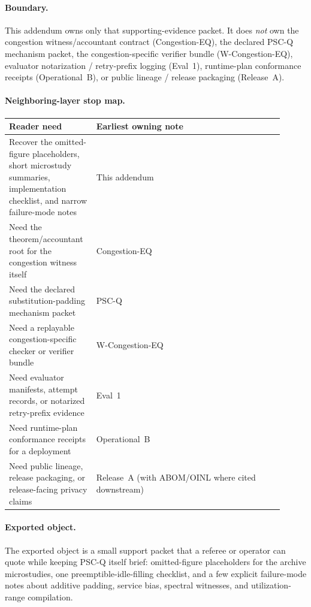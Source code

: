 \documentclass[11pt]{article}
\theoremstyle{definition}
\theoremstyle{remark}
\begin{document}
\paragraph{Boundary.}
This addendum owns only that supporting-evidence packet.
It does \emph{not} own the congestion witness/accountant contract (Congestion-EQ), the declared PSC-Q mechanism packet, the congestion-specific verifier bundle (W-Congestion-EQ), evaluator notarization / retry-prefix logging (Eval~1), runtime-plan conformance receipts (Operational~B), or public lineage / release packaging (Release~A).\cite{series:congeq,series:pscq,series:wcongeq,series:evalnotary,series:opb,series:releaseproperty}

\paragraph{Neighboring-layer stop map.}
\medskip
\noindent\begin{center}
\small
\begin{tabular}{p{0.27\linewidth}p{0.64\linewidth}}
\toprule
Reader need & Earliest owning note \\
\midrule
Recover the omitted-figure placeholders, short microstudy summaries, implementation checklist, and narrow failure-mode notes & This addendum \\
Need the theorem/accountant root for the congestion witness itself & Congestion-EQ \\
Need the declared substitution-padding mechanism packet & PSC-Q \\
Need a replayable congestion-specific checker or verifier bundle & W-Congestion-EQ \\
Need evaluator manifests, attempt records, or notarized retry-prefix evidence & Eval~1 \\
Need runtime-plan conformance receipts for a deployment & Operational~B \\
Need public lineage, release packaging, or release-facing privacy claims & Release~A (with ABOM/OINL where cited downstream) \\
\bottomrule
\end{tabular}
\end{center}

\paragraph{Exported object.}
The exported object is a small support packet that a referee or operator can quote while keeping PSC-Q itself brief: omitted-figure placeholders for the archive microstudies, one preemptible-idle-filling checklist, and a few explicit failure-mode notes about additive padding, service bias, spectral witnesses, and utilization-range compilation.
\end{document}
